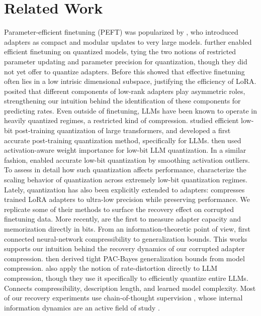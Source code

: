 \section{Related Work}

Parameter-efficient finetuning (PEFT) was popularized by \citep{hu2022lora}, who introduced adapters as compact and modular updates to very large models. \citep{dettmers2023qlora} further enabled efficient finetuning on quantized models, tying the two notions of restricted parameter updating and parameter precision for quantization, though they did not yet offer to quantize adapters. Before this \citep{aghajanyan2021intrinsicdim} showed that effective finetuning often lies in a low intrisic dimensional subspace, justifying the efficiency of LoRA. \citep{zhu2024loraasymmetry} posited that different components of low-rank adapters play asymmetric roles, strengthening our intuition behind the identification of these components for predicting rates.
\newline
Even outside of finetuning, LLMs have been known to operate in heavily quantized regimes, a restricted kind of compression. \citep{yao2022zeroquant} studied efficient low-bit post-training quantization of large transformers, and \citep{frantar2023gptq} developed a first accurate post-training quantization method, specifically for LLMs. \citep{lin2024awq} then used activation-aware weight importance for low-bit LLM quantization. In a similar fashion, \citep{xiao2023smoothquant} enabled accurate low-bit quantization by smoothing activation outliers.
To assess in detail how such quantization affects performance, \citep{liu2025paretoq} characterize the scaling behavior of quantization across extremely low-bit quantization regimes.
Lately, quantization has also been explicitly extended to adapters:
\citep{mirzaei2025loraquant} compresses trained LoRA adapters to ultra-low precision while preserving performance. We replicate some of their methods to surface the recovery effect on corrupted finetuning data. More recently, \citep{tan2026adapterbits} are the first to measure adapter capacity and memorization directly in bits.
\newline
From an information-theoretic point of view, \citep{arora2018genbounds} first connected neural-network compressibility to generalization bounds. This works supports our intuition behind the recovery dynamics of our corrupted adapter compression. \citep{lotfi2022pacbayescomp} then derived tight PAC-Bayes generalization bounds from model compression.
\citep{young2025radio} also apply the notion of rate-distortion directly to LLM compression, though they use it specifically to efficiently quantize entire LLMs. \citep{urdshals2025compressibility} Connects compressibility, description length, and learned model complexity.
\newline
Most of our recovery experiments use chain-of-thought supervision \citep{wei2022cot}, whose internal information dynamics are an active field of study \citep{qian2025reasoningdynamics,dutta2024stepbystep,yang2025symbolicmechanisms}.
